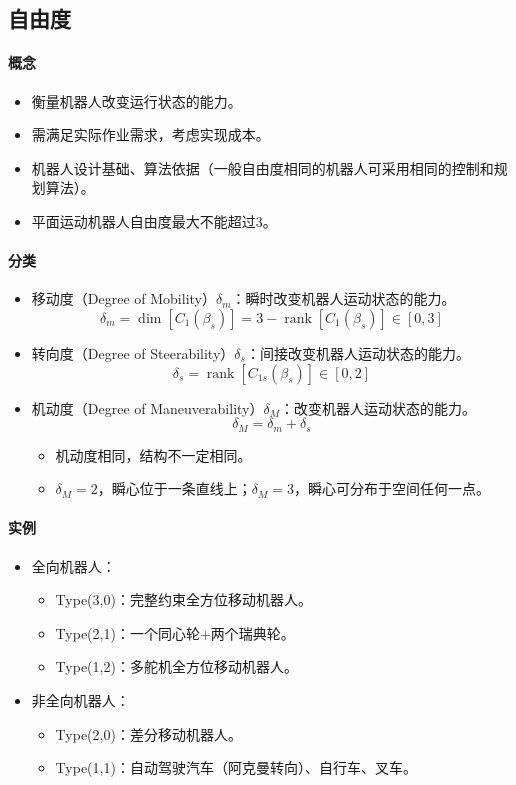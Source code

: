 \documentclass[
12pt, %
a4paper, 
oneside, %
headinclude,footinclude, %
]{scrartcl}
\begin{document}
\subsection{自由度}
\paragraph{概念}
\begin{itemize}
\item 衡量机器人改变运行状态的能力。
\item 需满足实际作业需求，考虑实现成本。
\item 机器人设计基础、算法依据（一般自由度相同的机器人可采用相同的控制和规划算法）。
\item 平面运动机器人自由度最大不能超过$ 3 $。
\end{itemize}
\paragraph{分类}
\begin{itemize}
\item 移动度（Degree of Mobility）$ \delta_m $：瞬时改变机器人运动状态的能力。
$$ \delta_m = \dim[C_1(\beta_s)] = 3 - \operatorname{rank}[C_1(\beta_s)] \in [0,3] $$
\item 转向度（Degree of Steerability）$ \delta_s $：间接改变机器人运动状态的能力。
$$ \delta_s = \operatorname{rank}[C_{1s}(\beta_s)] \in [0,2] $$
\item 机动度（Degree of Maneuverability）$ \delta_M $：改变机器人运动状态的能力。
$$ \delta_M = \delta_m + \delta_s $$
\begin{itemize}
\item 机动度相同，结构不一定相同。
\item $ \delta_M = 2 $，瞬心位于一条直线上；$ \delta_M = 3 $，瞬心可分布于空间任何一点。
\end{itemize}
\end{itemize}
\paragraph{实例}
\begin{itemize}
\item 全向机器人：
\begin{itemize}
\item Type(3,0)：完整约束全方位移动机器人。
\item Type(2,1)：一个同心轮+两个瑞典轮。
\item Type(1,2)：多舵机全方位移动机器人。
\end{itemize}
\item 非全向机器人：
\begin{itemize}
\item Type(2,0)：差分移动机器人。
\item Type(1,1)：自动驾驶汽车（阿克曼转向）、自行车、叉车。
\end{itemize}
\end{itemize}
\end{document}
